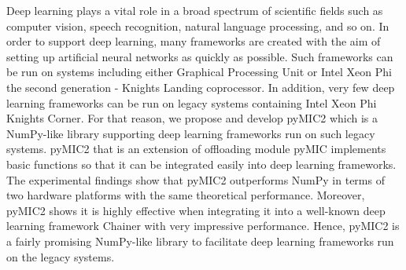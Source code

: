 Deep learning plays a vital role in a broad spectrum of scientific fields such as computer vision, speech recognition, natural language processing, and so on. In order to support deep learning, many frameworks are created with the aim of setting up artificial neural networks as quickly as possible. Such frameworks can be run on systems including either Graphical Processing Unit or Intel Xeon Phi the second generation - Knights Landing coprocessor. In addition, very few deep learning frameworks can be run on legacy systems containing Intel Xeon Phi Knights Corner. For that reason, we propose and develop pyMIC2 which is a NumPy-like library supporting deep learning frameworks run on such legacy systems. pyMIC2 that is an extension of offloading module pyMIC implements basic functions so that it can be integrated easily into deep learning frameworks. The experimental findings show that pyMIC2 outperforms NumPy in terms of two hardware platforms with the same theoretical performance. Moreover, pyMIC2 shows it is highly effective when integrating it into a well-known deep learning framework Chainer with very impressive performance. Hence, pyMIC2 is a fairly promising NumPy-like library to facilitate deep learning frameworks run on the legacy systems.